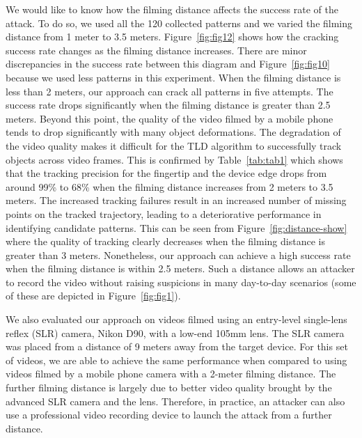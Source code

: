            We would like to know how the filming distance affects the
           success rate of the attack. To do so, we used all the 120 collected patterns and we varied the
           filming distance from 1 meter to 3.5 meters.
           Figure~\ref{fig:fig12} shows how the cracking success rate changes
           as the filming distance increases. There are minor discrepancies in the success rate between this diagram and Figure~\ref{fig:fig10}
            because we used less patterns in this experiment.
           When the filming distance is less than 2 meters, our approach can crack all patterns in five attempts.
           The success rate drops significantly when
           the filming distance is greater than 2.5 meters.
           Beyond this point, the quality of the video filmed by a mobile phone tends to drop significantly with many object deformations. The degradation of the video quality makes it difficult for the TLD algorithm to successfully track objects across video frames.
            This is confirmed by Table~\ref{tab:tab1}
           which shows that the tracking precision for the fingertip and the device edge drops from around 99\% to
           68\% when the filming
           distance increases from 2 meters to 3.5 meters. The increased
           tracking failures result in an increased number of missing
           points on the tracked trajectory, leading to a deteriorative performance in identifying candidate patterns.
           This can be seen from Figure~\ref{fig:distance-show} where the quality
           of tracking clearly decreases when the filming distance is greater
           than 3 meters.
           Nonetheless, our approach can
           achieve a high success rate when the filming distance is within
           2.5 meters. Such a distance allows an attacker to
           record the video without raising suspicions in many day-to-day scenarios (some of these are
           depicted in Figure~\ref{fig:fig1}).

            We also evaluated our approach on videos filmed using an entry-level
            single-lens reflex (SLR) camera, Nikon D90, with a low-end 105mm lens. The SLR camera
            was placed from a distance of 9 meters away from the target
            device. For this set of videos, we are able to achieve the same
            performance when compared to using videos filmed by a mobile
            phone camera with a 2-meter filming distance. The further filming
            distance is largely due to better video quality brought by the advanced
            SLR camera and the lens. Therefore, in practice, an attacker can
            also use a professional video recording device to launch the
            attack from a further distance.

